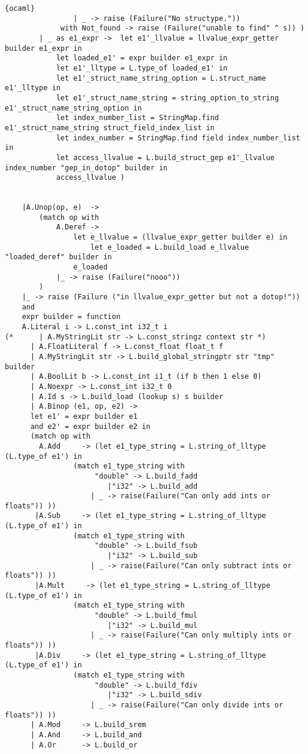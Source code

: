 \begin{lstlisting}{ocaml}
				| _ -> raise (Failure("No structype."))
			 with Not_found -> raise (Failure("unable to find" ^ s)) )
		| _ as e1_expr ->  let e1'_llvalue = llvalue_expr_getter builder e1_expr in
			let loaded_e1' = expr builder e1_expr in
			let e1'_lltype = L.type_of loaded_e1' in
			let e1'_struct_name_string_option = L.struct_name e1'_lltype in
			let e1'_struct_name_string = string_option_to_string e1'_struct_name_string_option in
			let index_number_list = StringMap.find e1'_struct_name_string struct_field_index_list in
			let index_number = StringMap.find field index_number_list in
			let access_llvalue = L.build_struct_gep e1'_llvalue index_number "gep_in_dotop" builder in
			access_llvalue )
	
	
	|A.Unop(op, e)  ->
		(match op with
			A.Deref ->
				let e_llvalue = (llvalue_expr_getter builder e) in
			        let e_loaded = L.build_load e_llvalue "loaded_deref" builder in 
				e_loaded
			|_ -> raise (Failure("nooo"))
		)
	|_ -> raise (Failure ("in llvalue_expr_getter but not a dotop!"))
    and
    expr builder = function
	A.Literal i -> L.const_int i32_t i
(*      | A.MyStringLit str -> L.const_stringz context str *)
      | A.FloatLiteral f -> L.const_float float_t f
      | A.MyStringLit str -> L.build_global_stringptr str "tmp" builder
      | A.BoolLit b -> L.const_int i1_t (if b then 1 else 0)
      | A.Noexpr -> L.const_int i32_t 0
      | A.Id s -> L.build_load (lookup s) s builder
      | A.Binop (e1, op, e2) ->
	  let e1' = expr builder e1
	  and e2' = expr builder e2 in
	  (match op with
	    A.Add     -> (let e1_type_string = L.string_of_lltype (L.type_of e1') in 
				(match e1_type_string with
					 "double" -> L.build_fadd 
		      			|"i32" -> L.build_add
					| _ -> raise(Failure("Can only add ints or floats")) ))
	   |A.Sub     -> (let e1_type_string = L.string_of_lltype (L.type_of e1') in 
				(match e1_type_string with
					 "double" -> L.build_fsub 
		      			|"i32" -> L.build_sub
					| _ -> raise(Failure("Can only subtract ints or floats")) ))
	   |A.Mult     -> (let e1_type_string = L.string_of_lltype (L.type_of e1') in 
				(match e1_type_string with
					 "double" -> L.build_fmul
		      			|"i32" -> L.build_mul 	
					| _ -> raise(Failure("Can only multiply ints or floats")) ))
	   |A.Div     -> (let e1_type_string = L.string_of_lltype (L.type_of e1') in 
				(match e1_type_string with
					 "double" -> L.build_fdiv 
		      			|"i32" -> L.build_sdiv
					| _ -> raise(Failure("Can only divide ints or floats")) ))
	  | A.Mod     -> L.build_srem
	  | A.And     -> L.build_and
	  | A.Or      -> L.build_or

\end{lstlisting}
